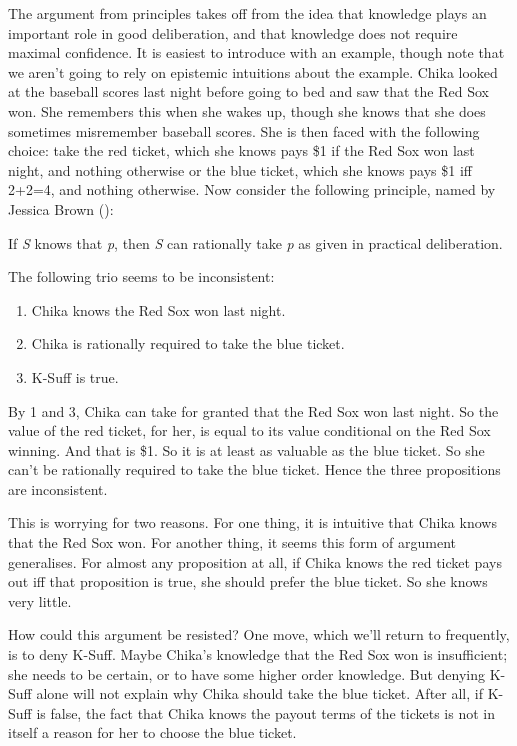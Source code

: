 \documentclass[
  11pt,
  letterpaper,
  DIV=11,
  numbers=noendperiod,
  twoside]{scrartcl}
\providecommand{\tightlist}{%
  \setlength{\itemsep}{0pt}\setlength{\parskip}{0pt}}
\begin{document}
The argument from principles takes off from the idea that knowledge
plays an important role in good deliberation, and that knowledge does
not require maximal confidence. It is easiest to introduce with an
example, though note that we aren't going to rely on epistemic
intuitions about the example. Chika looked at the baseball scores last
night before going to bed and saw that the Red Sox won. She remembers
this when she wakes up, though she knows that she does sometimes
misremember baseball scores. She is then faced with the following
choice: take the red ticket, which she knows pays \$1 if the Red Sox won
last night, and nothing otherwise or the blue ticket, which she knows
pays \$1 iff 2+2=4, and nothing otherwise. Now consider the following
principle, named by Jessica Brown ():

\begin{description}
\tightlist
\item[K-Suff]
If \emph{S} knows that \emph{p}, then \emph{S} can rationally take
\emph{p} as given in practical deliberation.
\end{description}

The following trio seems to be inconsistent:

\begin{enumerate}
\def\labelenumi{\arabic{enumi}.}
\tightlist
\item
  Chika knows the Red Sox won last night.
\item
  Chika is rationally required to take the blue ticket.
\item
  K-Suff is true.
\end{enumerate}

By 1 and 3, Chika can take for granted that the Red Sox won last night.
So the value of the red ticket, for her, is equal to its value
conditional on the Red Sox winning. And that is \$1. So it is at least
as valuable as the blue ticket. So she can't be rationally required to
take the blue ticket. Hence the three propositions are inconsistent.

This is worrying for two reasons. For one thing, it is intuitive that
Chika knows that the Red Sox won. For another thing, it seems this form
of argument generalises. For almost any proposition at all, if Chika
knows the red ticket pays out iff that proposition is true, she should
prefer the blue ticket. So she knows very little.

How could this argument be resisted? One move, which we'll return to
frequently, is to deny K-Suff. Maybe Chika's knowledge that the Red Sox
won is insufficient; she needs to be certain, or to have some higher
order knowledge. But denying K-Suff alone will not explain why Chika
should take the blue ticket. After all, if K-Suff is false, the fact
that Chika knows the payout terms of the tickets is not in itself a
reason for her to choose the blue ticket.
\end{document}
